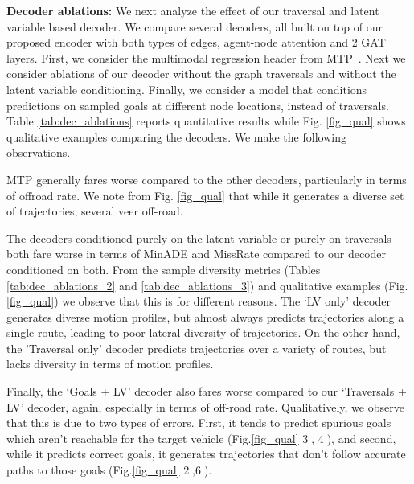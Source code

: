 \documentclass{article}
\begin{document}
\textbf{Decoder ablations:}
We next analyze the effect of our traversal and latent variable based decoder. We compare several decoders, all built on top of our proposed encoder with both types of edges, agent-node attention and 2 GAT layers. First, we consider the multimodal regression header from  MTP~\citep{cui2019multimodal}. Next we consider ablations of our decoder without the graph traversals and without the latent variable conditioning. Finally, we consider a model that conditions predictions on sampled goals at different node locations, instead of traversals. Table \ref{tab:dec_ablations} reports quantitative results while Fig. \ref{fig_qual} shows qualitative examples comparing the decoders. We make the following observations. 

MTP generally fares worse compared to the other decoders, particularly in terms of offroad rate. We note from Fig. \ref{fig_qual} that while it generates a diverse set of trajectories, several veer off-road.

The decoders conditioned purely on the latent variable or purely on traversals both fare worse in terms of MinADE and MissRate compared to our decoder conditioned on both. From the sample diversity metrics (Tables \ref{tab:dec_ablations_2} and \ref{tab:dec_ablations_3}) and qualitative examples (Fig.\ref{fig_qual}) we observe that this is for different reasons. The `LV only' decoder generates diverse motion profiles, but almost always predicts trajectories along a single route, leading to poor lateral diversity of trajectories. On the other hand, the 'Traversal only' decoder predicts trajectories over a variety of routes, but lacks diversity in terms of motion profiles. 


Finally, the `Goals + LV' decoder also fares worse compared to our `Traversals + LV' decoder, again, especially in terms of off-road rate. Qualitatively, we observe that this is due to two types of errors. First, it tends to predict spurious goals which aren't reachable for the target vehicle (Fig.\ref{fig_qual} \textcircled{3}, \textcircled{4}), and second, while it predicts correct goals, it generates trajectories that don't follow accurate paths to those goals (Fig.\ref{fig_qual} \textcircled{2},\textcircled{6}).    
\end{document}
